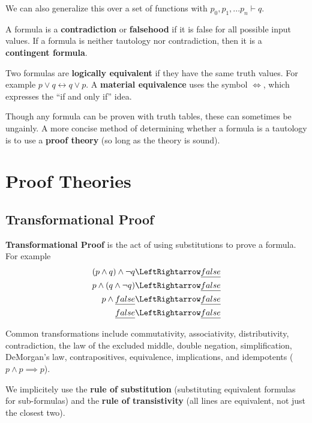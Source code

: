 \documentclass[12pt]{article}
\begin{document}
We can also generalize this over a set of functions with $p_0, p_1, ... p_n \vdash q$.

A formula is a {\bf contradiction} or {\bf falsehood} if it is false for all possible input values. If a formula is neither tautology nor contradiction, then it is a {\bf contingent formula}.

Two formulas are {\bf logically equivalent} if they have the same truth values. For example $p \lor q \leftrightarrow q \lor p$. A {\bf material equivalence} uses the symbol $\Leftrightarrow$, which expresses the ``if and only if'' idea.

Though any formula can be proven with truth tables, these can sometimes be ungainly. A more concise method of determining whether a formula is a tautology is to use a {\bf proof theory} (so long as the theory is sound).

\section*{Proof Theories}
\subsection*{Transformational Proof}
{\bf Transformational Proof} is the act of using substitutions to prove a formula. For example
\begin{align*}
(p \land q) \land \neg q &\LeftRightarrow \emph{false}\\
p \land (q \land \neg q) &\LeftRightarrow \emph{false}\\
p \land \emph{false} &\LeftRightarrow \emph{false}\\
\emph{false} &\LeftRightarrow \emph{false}
\end{align*}

Common transformations include commutativity, associativity, distributivity, contradiction, the law of the excluded middle, double negation, simplification, DeMorgan's law, contrapositives, equivalence, implications, and idempotents ($p \land p \implies p$).

We implicitely use the {\bf rule of substitution} (substituting equivalent formulas for sub-formulas) and the {\bf rule of transistivity} (all lines are equivalent, not just the closest two).
\end{document}

